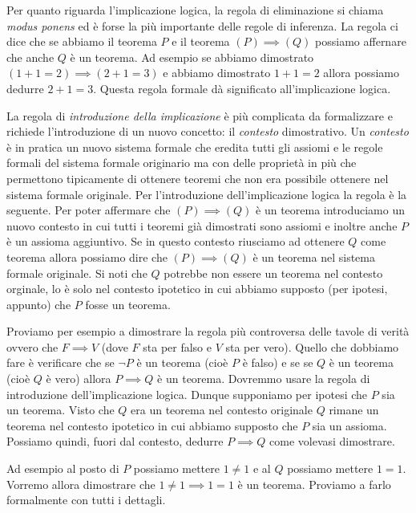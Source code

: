 Per quanto riguarda l'implicazione logica, la regola di eliminazione 
%
si chiama \emph{modus ponens} ed è forse la più importante 
%
%
delle regole di inferenza.
La regola ci dice che se abbiamo il teorema 
$P$ e il teorema $(P)\implies (Q)$ possiamo affernare che anche 
$Q$ è un teorema.
Ad esempio se abbiamo dimostrato $(1+1=2) \implies (2+1=3)$ 
e abbiamo dimostrato $1+1=2$ allora possiamo dedurre $2+1=3$.
Questa regola formale dà significato all'implicazione logica.

La regola di \emph{introduzione della implicazione} è più complicata 
%
da formalizzare e richiede l'introduzione di un nuovo concetto:
il \emph{contesto} dimostrativo.
%
%
Un \emph{contesto} è in pratica un nuovo sistema formale che 
eredita tutti gli assiomi e le regole formali del sistema formale 
originario ma con delle proprietà in più che permettono tipicamente di 
ottenere teoremi che non era possibile ottenere nel sistema formale 
originale.
Per l'introduzione dell'implicazione logica la regola 
è la seguente. Per poter affermare che $(P)\implies (Q)$ 
è un teorema introduciamo un nuovo contesto in cui 
tutti i teoremi già dimostrati sono assiomi e inoltre 
anche $P$ è un assioma aggiuntivo. 
Se in questo contesto riusciamo ad ottenere $Q$ come
teorema allora possiamo dire che $(P)\implies (Q)$ è un teorema 
nel sistema formale originale.
Si noti che $Q$ potrebbe non essere un teorema nel contesto 
orginale, lo è solo nel contesto ipotetico in cui abbiamo 
supposto (per ipotesi, appunto) che $P$ fosse un teorema.

Proviamo per esempio a dimostrare la regola più controversa
delle tavole di verità ovvero
che $F\implies V$ (dove $F$ sta per falso e 
$V$ sta per vero). 
Quello che dobbiamo fare è verificare che se $\lnot P$ 
è un teorema (cioè $P$ è falso) e se se $Q$ è un teorema 
(cioè $Q$ è vero) allora $P\implies Q$ è un teorema.
Dovremmo usare la regola di introduzione dell'implicazione logica.
Dunque supponiamo per ipotesi che $P$ sia un teorema. 
Visto che $Q$ era un teorema nel contesto originale 
$Q$ rimane un teorema nel contesto ipotetico in cui 
abbiamo supposto che $P$ sia un assioma.
Possiamo quindi, fuori dal contesto, dedurre $P\implies Q$ 
come volevasi dimostrare.

Ad esempio al posto di $P$ possiamo mettere $1\neq 1$ 
e al $Q$ possiamo mettere $1=1$. 
Vorremo allora dimostrare che $1\neq 1 \implies 1=1$ 
è un teorema.
Proviamo a farlo formalmente con tutti i dettagli.

